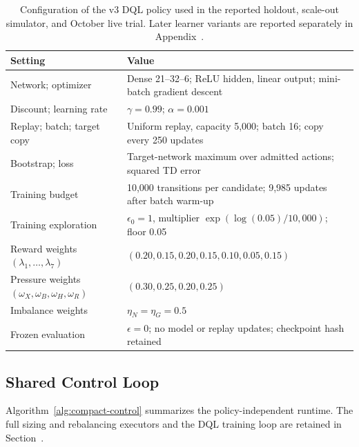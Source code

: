 \begin{table}[!htbp]
\centering\small
\caption{Configuration of the v3 DQL policy used in the reported holdout,
scale-out simulator, and October live trial. Later learner variants are
reported separately in Appendix~.}
\label{tab:dql-configuration}
\begin{tabular}{p{}p{}}
\toprule
Setting & Value\\
\midrule
Network; optimizer & Dense 21--32--6; ReLU hidden, linear output; mini-batch gradient descent\\
Discount; learning rate & $\gamma=0.99$; $\alpha=0.001$\\
Replay; batch; target copy & Uniform replay, capacity 5,000; batch 16; copy every 250 updates\\
Bootstrap; loss & Target-network maximum over admitted actions; squared TD error\\
Training budget & 10,000 transitions per candidate; 9,985 updates after batch warm-up\\
Training exploration & $\epsilon_0=1$, multiplier $\exp(\log(0.05)/10{,}000)$; floor 0.05\\
Reward weights $(\lambda_1,\ldots,\lambda_7)$ & $(0.20,0.15,0.20,0.15,0.10,0.05,0.15)$\\
Pressure weights $(\omega_X,\omega_B,\omega_H,\omega_R)$ & $(0.30,0.25,0.20,0.25)$\\
Imbalance weights & $\eta_N=\eta_G=0.5$\\
Frozen evaluation & $\epsilon=0$; no model or replay updates; checkpoint hash retained\\
\bottomrule
\end{tabular}
\end{table}

\subsection{Shared Control Loop}
Algorithm~\ref{alg:compact-control} summarizes the policy-independent runtime.
The full sizing and rebalancing executors and the DQL training loop are
retained in Section~.

